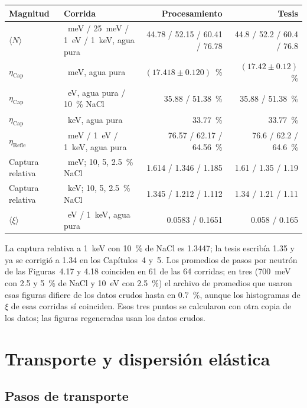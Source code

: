 \documentclass[11pt,a4paper]{article}
\begin{document}
\begin{center}
\small
\begin{tabularx}{\linewidth}{@{}l>{\raggedright\arraybackslash}Xrr@{}}
\toprule
\textbf{Magnitud} & \textbf{Corrida} & \textbf{Procesamiento} & \textbf{Tesis} \\
\midrule
$\langle N\rangle$ & 1~meV / 25~meV / 1~eV / 1~keV, agua pura & 44.78 / 52.15 / 60.41 / 76.78 & 44.8 / 52.2 / 60.4 / 76.8 \\
$\eta_\mathrm{Cap}$ & 1~meV, agua pura & $(17.418\pm0.120)$~\% & $(17.42\pm0.12)$~\% \\
$\eta_\mathrm{Cap}$ & 1~eV, agua pura / 10~\% NaCl & 35.88 / 51.38~\% & 35.88 / 51.38~\% \\
$\eta_\mathrm{Cap}$ & 1~keV, agua pura & 33.77~\% & 33.77~\% \\
$\eta_\mathrm{Refle}$ & 1~meV / 1~eV / 1~keV, agua pura & 76.57 / 62.17 / 64.56~\% & 76.6 / 62.2 / 64.6~\% \\
Captura relativa & 1~meV; 10, 5, 2.5~\% NaCl & 1.614 / 1.346 / 1.185 & 1.61 / 1.35 / 1.19 \\
Captura relativa & 1~keV; 10, 5, 2.5~\% NaCl & 1.345 / 1.212 / 1.112 & 1.34 / 1.21 / 1.11 \\
$\langle\xi\rangle$ & 1~eV / 1~keV, agua pura & 0.0583 / 0.1651 & 0.058 / 0.165 \\
\bottomrule
\end{tabularx}
\end{center}

La captura relativa a 1~keV con 10~\% de NaCl es 1.3447; la tesis escribía 1.35 y ya se corrigió a 1.34 en los Capítulos~4 y~5. Los promedios de pasos por neutrón de las Figuras~4.17 y 4.18 coinciden en 61 de las 64 corridas; en tres (700~meV con 2.5 y 5~\% de NaCl y 10~eV con 2.5~\%) el archivo de promedios que usaron esas figuras difiere de los datos crudos hasta en 0.7~\%, aunque los histogramas de $\xi$ de esas corridas sí coinciden. Esos tres puntos se calcularon con otra copia de los datos; las figuras regeneradas usan los datos crudos.

\section{Transporte y dispersión elástica}
\label{sec:transporte}

\subsection{Pasos de transporte}
\end{document}
